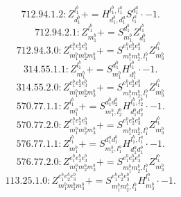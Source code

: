 \documentclass[letterpaper,10pt,fleqn,leqno,onecolumn]{article}
\begin{document}
\begin{equation} \;\;\;\;\;\;  712.94.1.2: Z^{l_{1}^{b}}_{d_{1}^{b}}+=H^{l_{1}^{b},l_{1}^{a}}_{d_{1}^{b},d_{1}^{a}}S^{d_{1}^{a}}_{l_{1}^{a}}\cdot -1. \end{equation}
\begin{equation} \;\;\;\;\;\;  712.94.2.1: Z^{l_{1}^{b}}_{m_{1}^{b}}+=S^{d_{1}^{b}}_{m_{1}^{b}}Z^{l_{1}^{b}}_{d_{1}^{b}} \end{equation}
\begin{equation} \;\;\;\;\;\;  712.94.3.0: Z^{e_{1}^{b}e_{2}^{b}e_{3}^{b}}_{m_{1}^{b}m_{2}^{b}m_{3}^{b}}+=S^{e_{1}^{b}e_{2}^{b}e_{3}^{b}}_{m_{1}^{b}m_{2}^{b},l_{1}^{b}}Z^{l_{1}^{b}}_{m_{3}^{b}} \end{equation}
\begin{equation} \;\;\;\;\;\;  314.55.1.1: Z^{l_{1}^{b}}_{m_{1}^{b}}+=S^{d_{1}^{b}}_{m_{1}^{b}}H^{l_{1}^{b}}_{d_{1}^{b}}\cdot -1. \end{equation}
\begin{equation} \;\;\;\;\;\;  314.55.2.0: Z^{e_{1}^{b}e_{2}^{b}e_{3}^{b}}_{m_{1}^{b}m_{2}^{b}m_{3}^{b}}+=S^{e_{1}^{b}e_{2}^{b}e_{3}^{b}}_{m_{1}^{b}m_{2}^{b},l_{1}^{b}}Z^{l_{1}^{b}}_{m_{3}^{b}} \end{equation}
\begin{equation} \;\;\;\;\;\;  570.77.1.1: Z^{l_{1}^{b}}_{m_{1}^{b}}+=S^{d_{1}^{b}d_{2}^{b}}_{m_{1}^{b},l_{2}^{b}}H^{l_{1}^{b},l_{2}^{b}}_{d_{1}^{b}d_{2}^{b}}\cdot -1. \end{equation}
\begin{equation} \;\;\;\;\;\;  570.77.2.0: Z^{e_{1}^{b}e_{2}^{b}e_{3}^{b}}_{m_{1}^{b}m_{2}^{b}m_{3}^{b}}+=S^{e_{1}^{b}e_{2}^{b}e_{3}^{b}}_{m_{1}^{b}m_{2}^{b},l_{1}^{b}}Z^{l_{1}^{b}}_{m_{3}^{b}} \end{equation}
\begin{equation} \;\;\;\;\;\;  576.77.1.1: Z^{l_{1}^{b}}_{m_{1}^{b}}+=S^{d_{1}^{a}d_{1}^{b}}_{m_{1}^{b},l_{1}^{a}}H^{l_{1}^{b},l_{1}^{a}}_{d_{1}^{a}d_{1}^{b}}\cdot -1. \end{equation}
\begin{equation} \;\;\;\;\;\;  576.77.2.0: Z^{e_{1}^{b}e_{2}^{b}e_{3}^{b}}_{m_{1}^{b}m_{2}^{b}m_{3}^{b}}+=S^{e_{1}^{b}e_{2}^{b}e_{3}^{b}}_{m_{1}^{b}m_{2}^{b},l_{1}^{b}}Z^{l_{1}^{b}}_{m_{3}^{b}} \end{equation}
\begin{equation} \;\;\;\;\;\;  113.25.1.0: Z^{e_{1}^{b}e_{2}^{b}e_{3}^{b}}_{m_{1}^{b}m_{2}^{b}m_{3}^{b}}+=S^{e_{1}^{b}e_{2}^{b}e_{3}^{b}}_{m_{1}^{b}m_{2}^{b},l_{1}^{b}}H^{l_{1}^{b}}_{m_{3}^{b}}\cdot -1. \end{equation}
\end{document}
